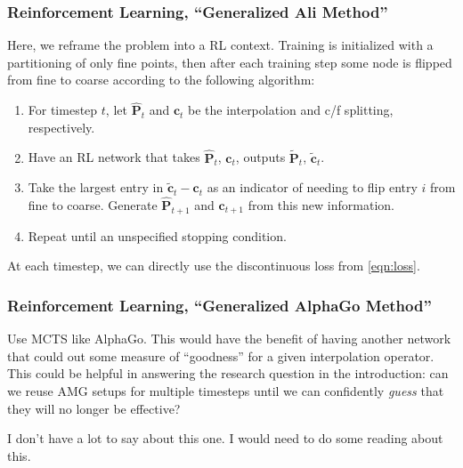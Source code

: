 \documentclass{article}
\newcommand{\mat}[1]{\bm{{#1}}}
\renewcommand{\vec}[1]{\bm{{#1}}}
\begin{document}
\subsubsection{Reinforcement Learning, ``Generalized Ali Method''}
Here, we reframe the problem into a RL context.  Training is initialized with a partitioning of only fine points, then after each training step some node is flipped from fine to coarse according to the following algorithm:
\begin{enumerate}
\item For timestep $t$, let $\hat{\mat{P}}_t$ and $\mat{c}_t$ be the interpolation and c/f splitting, respectively.
\item Have an RL network that takes $\hat{\mat{P}}_t$, $\mat{c}_t$, outputs $\widetilde{\mat{P}}_t$, $\widetilde{\mat{c}}_t$.
\item Take the largest entry in $\widetilde{\vec{c}}_t - \vec{c}_t$ as an indicator of needing to flip entry $i$ from fine to coarse.  Generate $\hat{\mat{P}}_{t+1}$ and $\mat{c}_{t+1}$ from this new information.
\item Repeat until an unspecified stopping condition.
\end{enumerate}
At each timestep, we can directly use the discontinuous loss from \eqref{eqn:loss}.
\subsubsection{Reinforcement Learning, ``Generalized AlphaGo Method''}
Use MCTS like AlphaGo.  This would have the benefit of having another network that could out some measure of ``goodness'' for a given interpolation operator.  This could be helpful in answering the research question in the introduction: can we reuse AMG setups for multiple timesteps until we can confidently \textit{guess} that they will no longer be effective?

I don't have a lot to say about this one.  I would need to do some reading about this.
\nocite{*}


\end{document}

